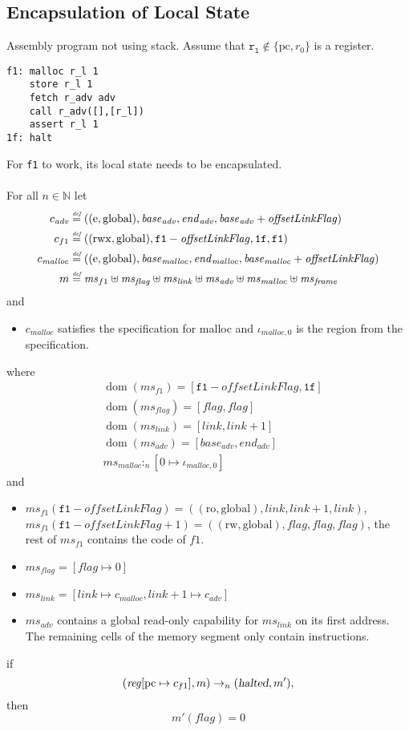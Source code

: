 \documentclass[a4paper]{article}
\newcommand{\forcenewline}{$\phantom{v}$\\}
\newcommand{\update}[2]{[#1 \mapsto #2]}
\newcommand{\defeq}{\stackrel{\textit{\tiny{def}}}{=}}
\DeclareMathOperator{\dom}{dom}
\newcommand{\var}[1]{\mathit{#1}}
\newcommand{\hs}{\var{ms}}
\newcommand{\ms}{\hs}
\newcommand{\pcreg}{\mathrm{pc}}
\newcommand{\start}{\var{base}}
\newcommand{\addrend}{\var{end}}
\newcommand{\reg}{\var{reg}}
\newcommand{\heap}{\var{mem}}
\newcommand{\adv}{\var{adv}}
\newcommand{\link}{\var{link}}
\newcommand{\flag}{\var{flag}}
\newcommand{\olf}{\var{offsetLinkFlag}}
\newcommand{\halted}{\textsl{halted}}
\newcommand{\heapSat}[3][\heap]{#1 :_{#2} #3}
\newcommand{\codelabel}[1]{\mathit{#1}}
\newcommand{\malloc}{\codelabel{malloc}}
\newcommand{\nats}{\mathbb{N}}
\newcommand{\plainperm}[1]{\mathrm{#1}}
\newcommand{\readonly}{\plainperm{ro}}
\newcommand{\readwrite}{\plainperm{rw}}
\newcommand{\entry}{\plainperm{e}}
\newcommand{\rwx}{\plainperm{rwx}}
\newcommand{\glob}{\plainperm{global}}
\newcommand{\step}[1][]{\rightarrow_{#1}}
\begin{document}
\subsection{Encapsulation of Local State}
Assembly program not using stack. Assume that $\mathtt{r_l} \not\in \{\pcreg,r_0 \}$ is a register.
\begin{verbatim}
f1: malloc r_l 1
    store r_l 1
    fetch r_adv adv
    call r_adv([],[r_l])
    assert r_l 1
1f: halt
\end{verbatim}
For \texttt{f1} to work, its local state needs to be encapsulated. 
\begin{lemma} \forcenewline
  \label{lem:correctness-f1}
  For all $n \in \nats$
  let
  \begin{align*}
    c_{\var{adv}} & \defeq ((\entry,\glob),\start_{\adv},\addrend_{\adv},\start_{\adv}+\olf) \\
    c_{f1} & \defeq ((\rwx,\glob),\mathtt{f1}-\olf,\mathtt{1f},\mathtt{f1}) \\
    c_\malloc & \defeq ((\entry,\glob),\start_\malloc,\addrend_\malloc,\start_\malloc+\olf) \\
    m & \defeq \hs_{f1} \uplus 
        \hs_\flag \uplus                
        \ms_{\var{link}} \uplus 
        \hs_\adv \uplus 
        \ms_{\malloc} \uplus 
        \hs_{\var{frame}} 
  \end{align*}
  and
  \begin{itemize}
  \item $c_\malloc$ satisfies the specification for malloc and $\iota_{\malloc,0}$ is the region from the specification.
  \end{itemize}
  where 
  \begin{align*}
    &\dom(\hs_{f1}) = [\mathtt{f1}-\olf,\mathtt{1f}] \\
    &\dom(\hs_\flag) = [\flag,\flag] \\
    &\dom(\ms_\link) = [\link,\link+1]\\
    &\dom(\hs_{\adv}) = [\start_\adv,\addrend_\adv] \\
    &\heapSat[\hs_{\malloc}]{n}{[0 \mapsto \iota_{\malloc,0}]}
  \end{align*}
  and
  \begin{itemize}
  \item $\ms_{f1}(\mathtt{f1}-\olf) = ((\readonly,\glob),\link,\link+1,\link)$, $\ms_{f1}(\mathtt{f1}-\olf+1) = ((\readwrite,\glob),\flag,\flag,\flag)$, the rest of $\hs_{f1}$ contains the code of $f1$.
  \item $\ms_\flag = [\flag \mapsto 0]$
  \item $\ms_{\var{link}} = [\var{link} \mapsto c_\malloc, \var{link} + 1 \mapsto c_\adv]$
  \item $\hs_\adv$ contains a global read-only capability for $\hs_\link$ on its first address. The remaining cells of the memory segment only contain instructions.
  \end{itemize}
  if 
  \[
    (\reg\update{\pcreg}{c_{f1}},m) \step[n] (\halted,m'),
  \]
  then
  \[
    m'(\flag) = 0
  \]  
\end{lemma}
\end{document}
